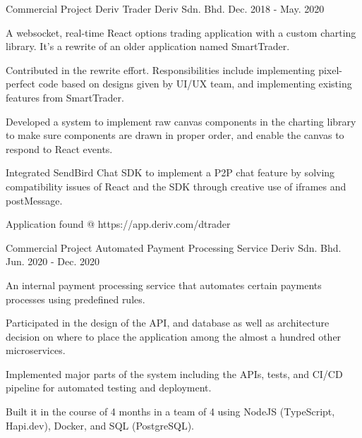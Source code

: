 

\begin{cventries}

  \cventry
    {Commercial Project} %
    {Deriv Trader} %
    {Deriv Sdn. Bhd.} %
    {Dec. 2018 - May. 2020} %
    {
      \begin{cvitems} %
        \item {A websocket, real-time React options trading application with a custom charting library. It's a rewrite of an older application named SmartTrader.}
        \item {Contributed in the rewrite effort. Responsibilities include implementing pixel-perfect code based on designs given by UI/UX team, and implementing existing features from SmartTrader.}
        \item {Developed a system to implement raw canvas components in the charting library to make sure components are drawn in proper order, and enable the canvas to respond to React events.}
        \item {Integrated SendBird Chat SDK to implement a P2P chat feature by solving compatibility issues of React and the SDK through creative use of iframes and postMessage. }
        \item {Application found @ https://app.deriv.com/dtrader}
      \end{cvitems}
    }

  \cventry
    {Commercial Project} %
    {Automated Payment Processing Service} %
    {Deriv Sdn. Bhd.} %
    {Jun. 2020 - Dec. 2020} %
    {
      \begin{cvitems} %
        \item {An internal payment processing service that automates certain payments processes using predefined rules.}
        \item {Participated in the design of the API, and database as well as architecture decision on where to place the application among the almost a hundred other microservices.}
        \item {Implemented major parts of the system including the APIs, tests, and CI/CD pipeline for automated testing and deployment.}
        \item {Built it in the course of 4 months in a team of 4 using NodeJS (TypeScript, Hapi.dev), Docker, and SQL (PostgreSQL).}
      \end{cvitems}
    }

\end{cventries}